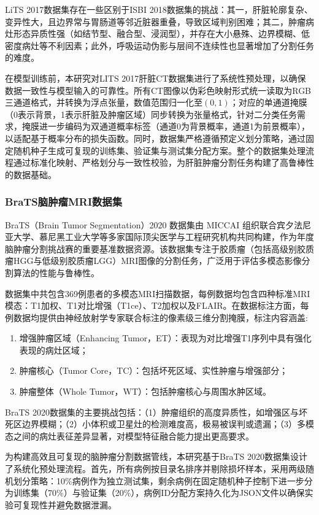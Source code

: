 LiTS 2017数据集存在一些区别于ISBI 2018数据集的挑战：其一，肝脏轮廓复杂、变异性大，且边界常与胃肠道等邻近脏器重叠，导致区域判别困难；其二，肿瘤病灶形态异质性强（如结节型、融合型、浸润型），并存在大小悬殊、边界模糊、低密度病灶等不利因素；此外，呼吸运动伪影与层间不连续性也显著增加了分割任务的难度。

在模型训练前，本研究对LITS 2017肝脏CT数据集进行了系统性预处理，以确保数据一致性与模型输入的可靠性。所有CT图像以伪彩色映射形式统一读取为RGB三通道格式，并转换为浮点张量，数值范围归一化至$(0,1)$；对应的单通道掩膜（0表示背景，1表示肝脏及肿瘤区域）同步转换为张量格式，针对二分类任务需求，掩膜进一步编码为双通道概率标签（通道0为背景概率，通道1为前景概率），以适配基于概率分布的损失函数。同时，数据集严格遵循预定义划分策略，通过固定随机种子生成可复现的训练集、验证集与测试集分配方案。整个的数据集处理流程通过标准化映射、严格划分与一致性校验，为肝脏肿瘤分割任务构建了高鲁棒性的数据基础。

\subsubsection{BraTS脑肿瘤MRI数据集}

BraTS（Brain Tumor Segmentation）2020 数据集由 MICCAI 组织联合宾夕法尼亚大学、慕尼黑工业大学等多家国际顶尖医学与工程研究机构共同构建，作为年度脑肿瘤分割挑战赛的重要基准数据资源\cite{menze2015}。该数据集专注于胶质瘤（包括高级别胶质瘤HGG与低级别胶质瘤LGG）MRI图像的分割任务，广泛用于评估多模态影像分割算法的性能与鲁棒性。

数据集中共包含369例患者的多模态MRI扫描数据，每例数据均包含四种标准MRI模态：T1加权、T1对比增强（T1ce）、T2加权以及FLAIR。在数据标注方面，每例数据均提供由神经放射学专家联合标注的像素级三维分割掩膜，标注内容涵盖:

\begin{enumerate}
    \item 增强肿瘤区域（Enhancing Tumor，ET）：表现为对比增强T1序列中具有强化表现的病灶区域；
    \item 肿瘤核心（Tumor Core，TC）：包括坏死区域、实性肿瘤与增强部分；
    \item 肿瘤整体（Whole Tumor，WT）：包括肿瘤核心与周围水肿区域。
\end{enumerate}

BraTS 2020数据集的主要挑战包括：（1）肿瘤组织的高度异质性，如增强区与坏死区边界模糊；（2）小体积或卫星灶的检测难度高，极易被误判或遗漏；（3）多模态之间的病灶表征差异显著，对模型特征融合能力提出更高要求。

为构建高效且可复现的脑肿瘤分割数据管线，本研究基于BraTS 2020数据集设计了系统化预处理流程。首先，所有病例按目录名排序并剔除损坏样本，采用两级随机划分策略：10\%病例作为独立测试集，剩余病例在固定随机种子控制下进一步分为训练集（70\%）与验证集（20\%），病例ID分配方案持久化为JSON文件以确保实验可复现性并避免数据泄漏。

